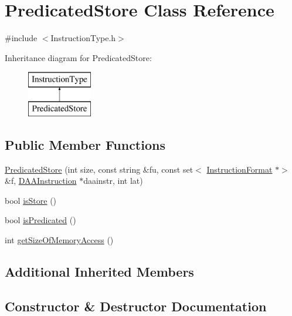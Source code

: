 \hypertarget{classPredicatedStore}{}\section{Predicated\+Store Class Reference}
\label{classPredicatedStore}


{\ttfamily \#include $<$Instruction\+Type.\+h$>$}

Inheritance diagram for Predicated\+Store\+:\begin{figure}[H]
\begin{center}
\leavevmode
\includegraphics[height=2.000000cm]{classPredicatedStore}
\end{center}
\end{figure}
\subsection*{Public Member Functions}
\begin{DoxyCompactItemize}
\item 
\hyperlink{classPredicatedStore_aeb981f4e954183897fc0e4a200620142}{Predicated\+Store} (int size, const string \&fu, const set$<$ \hyperlink{classInstructionFormat}{Instruction\+Format} $\ast$$>$ \&f, \hyperlink{classDAAInstruction}{D\+A\+A\+Instruction} $\ast$daainstr, int lat)
\item 
bool \hyperlink{classPredicatedStore_ada88354c4a4838c8ff5fa7b225f8a751}{is\+Store} ()
\item 
bool \hyperlink{classPredicatedStore_a204c4cac7241d1d1b61719c5fcbc6512}{is\+Predicated} ()
\item 
int \hyperlink{classPredicatedStore_a79f5e84001443055c5ae0547ec337759}{get\+Size\+Of\+Memory\+Access} ()
\end{DoxyCompactItemize}
\subsection*{Additional Inherited Members}


\subsection{Constructor \& Destructor Documentation}
\mbox{\label{classPredicatedStore_aeb981f4e954183897fc0e4a200620142}} 
